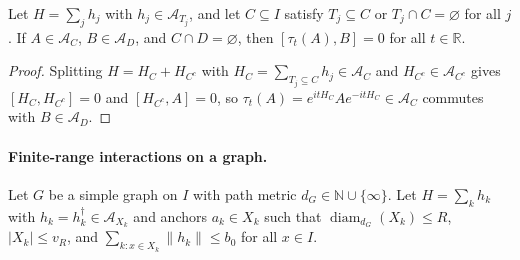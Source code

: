 \begin{lemma}
    \label{lem:qc_lr_closed_region}
    \leanok
    Let $H=\sum_jh_j$ with $h_j\in\mathcal A_{T_j}$, and let $C\subseteq I$ satisfy $T_j\subseteq C$ or $T_j\cap C=\varnothing$ for all $j$. If $A\in\mathcal A_C$, $B\in\mathcal A_D$, and $C\cap D=\varnothing$, then $[\tau_t(A),B]=0$ for all $t\in\mathbb R$.
\end{lemma}
\begin{proof}\leanok
    Splitting $H=H_C+H_{C^c}$ with $H_C=\sum_{T_j\subseteq C}h_j\in\mathcal A_C$ and $H_{C^c}\in\mathcal A_{C^c}$ gives $[H_C,H_{C^c}]=0$ and $[H_{C^c},A]=0$, so $\tau_t(A)=e^{itH_C}Ae^{-itH_C}\in\mathcal A_C$ commutes with $B\in\mathcal A_D$.
\end{proof}

\paragraph{Finite-range interactions on a graph.}
Let $G$ be a simple graph on $I$ with path metric $d_G\in\mathbb N\cup\{\infty\}$. Let $H=\sum_kh_k$ with $h_k=h_k^\dagger\in\mathcal A_{X_k}$ and anchors $a_k\in X_k$ such that $\operatorname{diam}_{d_G}(X_k)\le R$, $|X_k|\le v_R$, and $\sum_{k:x\in X_k}\|h_k\|\le b_0$ for all $x\in I$.

